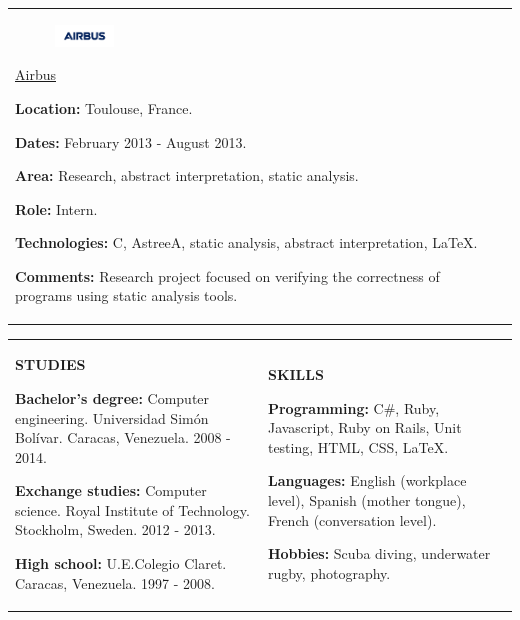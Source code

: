 \documentclass[10pt]{article}
\begin{document}
\begin{tabular}[t]{ll}
	\\

	\parbox{0.45\textwidth}
	{
		\begin{figure}
			\includegraphics[width=0.15\textwidth]{airbus}
		\end{figure}

		\begin{center}
			\underline{\href{http://www.airbus.com/}{Airbus}}
		\end{center}

		\textbf{Location:} Toulouse, France.

		\textbf{Dates:} February 2013 - August 2013.
	
		\textbf{Area:} Research, abstract interpretation, static analysis.
	
		\textbf{Role:} Intern.
	
		\textbf{Technologies:} C, AstreeA, static analysis, abstract interpretation, \LaTeX.
	
		\textbf{Comments:} Research project focused on verifying the correctness of programs using static analysis tools.
	}
\end{tabular}

\vspace{3mm}

\begin{tabular}{ll}

	\parbox{0.45\textwidth}
	{
		\begin{center}
			\textbf{\uppercase{Studies}}
		\end{center}

		\textbf{Bachelor's degree:} Computer engineering. Universidad Simón Bolívar. Caracas, Venezuela. 2008 - 2014.

		\textbf{Exchange studies:} Computer science. Royal Institute of Technology. Stockholm, Sweden. 2012 - 2013.

		\textbf{High school:} U.E.Colegio Claret. Caracas, Venezuela. 1997 - 2008.
	}

	&

	\parbox{0.45\textwidth}
	{
		\begin{center}
			\textbf{\uppercase{Skills}}
		\end{center}

		\textbf{Programming:} C\#, Ruby, Javascript, Ruby on Rails, Unit testing, HTML, CSS, \LaTeX.

		\textbf{Languages:} English (workplace level), Spanish (mother tongue), French (conversation level).

		\textbf{Hobbies:} Scuba diving, underwater rugby, photography.
	}

\end{tabular}
\end{document}

